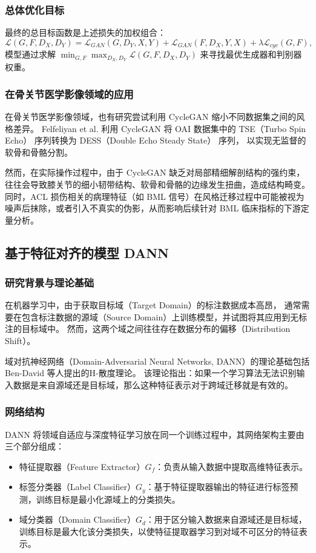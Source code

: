     \subsubsection{总体优化目标}
      最终的总目标函数是上述损失的加权组合：
      \begin{equation}
        \mathcal{L}(G, F, D_X, D_Y) = \mathcal{L}_{GAN}(G, D_Y, X, Y) + \mathcal{L}_{GAN}(F, D_X, Y, X) + \lambda \mathcal{L}_{cyc}(G, F),
      \end{equation}
      模型通过求解 $\min_{G,F} \max_{D_X,D_Y} \mathcal{L}(G, F, D_X, D_Y)$ 来寻找最优生成器和判别器权重。
    \subsubsection{在骨关节医学影像领域的应用}
      在骨关节医学影像领域，也有研究尝试利用 CycleGAN 缩小不同数据集之间的风格差异。
      Felfeliyan et al. 利用 CycleGAN 将 OAI 数据集中的 TSE（Turbo Spin Echo） 序列转换为 DESS（Double Echo Steady State） 序列，
      以实现无监督的软骨和骨骼分割\cite{felfeliyanMRIKneeDomain2021}。
      \par 然而，在实际操作过程中，由于 CycleGAN 缺乏对局部精细解剖结构的强约束，往往会导致膝关节的细小韧带结构、软骨和骨骼的边缘发生扭曲，造成结构畸变。
      同时，ACL 损伤相关的病理特征（如 BML 信号）在风格迁移过程中可能被视为噪声后抹除，或者引入不真实的伪影，从而影响后续针对 BML 临床指标的下游定量分析。
  \subsection{基于特征对齐的模型 DANN}
    \subsubsection{研究背景与理论基础}
      在机器学习中，由于获取目标域（Target Domain）的标注数据成本高昂，
      通常需要在包含标注数据的源域（Source Domain）上训练模型，并试图将其应用到无标注的目标域中。
      然而，这两个域之间往往存在数据分布的偏移（Distribution Shift）。
      \par 域对抗神经网络（Domain-Adversarial Neural Networks, DANN）\cite{ganinDomainAdversarialTrainingNeural2017}的理论基础包括 Ben-David 等人提出的H-散度理论\cite{ben-davidTheoryLearningDifferent2010}。
      该理论指出：如果一个学习算法无法识别输入数据是来自源域还是目标域，那么这种特征表示对于跨域迁移就是有效的。
    \subsubsection{网络结构}
      DANN 将领域自适应与深度特征学习放在同一个训练过程中，其网络架构主要由三个部分组成：
      \begin{itemize}
        \item 特征提取器（Feature Extractor）$G_f$：负责从输入数据中提取高维特征表示。
        \item 标签分类器（Label Classifier）$G_y$：基于特征提取器输出的特征进行标签预测，训练目标是最小化源域上的分类损失。
        \item 域分类器（Domain Classifier）$G_d$：用于区分输入数据来自源域还是目标域，训练目标是最大化该分类损失，以使特征提取器学习到对域不可区分的特征表示。
      \end{itemize}
